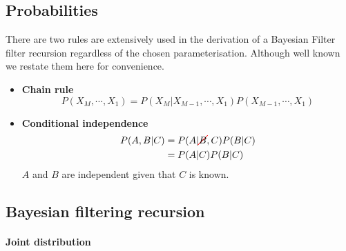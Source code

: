 
\subsection{Probabilities}

There are two rules are extensively used in the derivation of a Bayesian Filter filter recursion regardless 
of the chosen parameterisation. Although well known we restate them here for convenience.

\begin{itemize}
 \item \textbf{Chain rule}\\
 \begin{equation}
  P(X_M,\cdots,X_1) = P(X_M|X_{M-1},\cdots,X_1) P(X_{M-1},\cdots,X_1) \label{eq:ch5:chain_rule}
 \end{equation}
 \item \textbf{Conditional independence}\\
  \begin{align}
    P(A,B|C) &= P(A|\Ccancel[red]{B},C) P(B|C) \nonumber \\
             &= P(A|C) P(B|C)
  \end{align}
  $A$ and $B$ are independent given that $C$ is known.
\end{itemize}


\subsection{Bayesian filtering recursion}\label{appendix:bayes_recursion}

\paragraph{Joint distribution}\\

